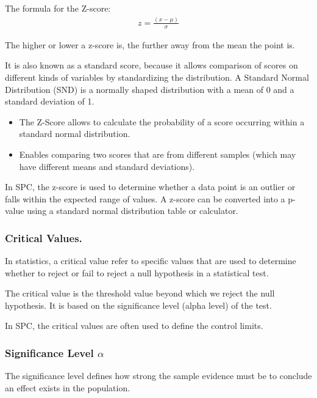 \documentclass[11pt]{article}
\begin{document}
The formula for the Z-score: 
\begin{gather}
  z=\frac{(x-\mu)}{\sigma}
\end{gather}


The higher or lower a z-score is, the further away from the mean the
point is.

It is also known as a standard score, because it allows comparison of
scores on different kinds of variables by standardizing the
distribution. A Standard Normal Distribution (SND) is a normally shaped
distribution with a mean of 0 and a standard deviation of 1.

\begin{itemize}
\item
  The Z-Score allows to calculate the probability of a score occurring
  within a standard normal distribution.
\item
  Enables comparing two scores that are from different samples (which
  may have different means and standard deviations).
\end{itemize}

In SPC, the z-score is used to determine whether a data point is an
outlier or falls within the expected range of values. A z-score can be
converted into a p-value using a standard normal distribution table or
calculator.

\hypertarget{critical-values.}{%
\subsubsection{Critical Values.}\label{critical-values.}}

In statistics, a critical value refer to specific values that are used
to determine whether to reject or fail to reject a null hypothesis in a
statistical test.

The critical value is the threshold value beyond which we reject the
null hypothesis. It is based on the significance level (alpha level) of
the test.

In SPC, the critical values are often used to define the control limits.

\hypertarget{significance-level-alpha}{%
\subsubsection{\texorpdfstring{Significance Level
\(\alpha\)}{Significance Level \textbackslash alpha}}\label{significance-level-alpha}}

The significance level defines how strong the sample evidence must be to
conclude an effect exists in the population.
\end{document}
